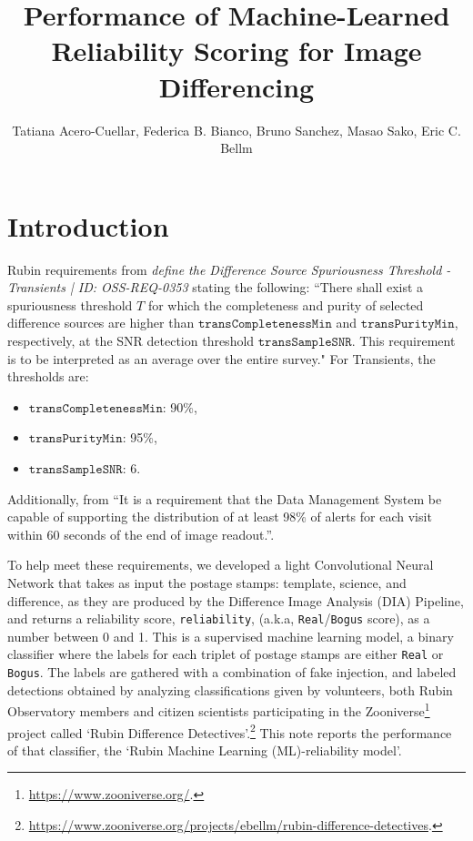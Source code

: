 \documentclass[DM,authoryear,toc]{lsstdoc}
\title{Performance of Machine-Learned Reliability Scoring for Image Differencing}
\date{\vcsDate}
\author{Tatiana Acero-Cuellar, Federica B. Bianco, Bruno Sanchez, Masao Sako, Eric C. Bellm}
\newcommand{\rel}{{\texttt{reliability}}}
\begin{document}
\maketitle


\section{Introduction}\label{sec:intro}
Rubin requirements from \textit{\cite
{LSE-30} define the Difference Source Spuriousness Threshold - Transients | ID: OSS-REQ-0353} stating the following:
``There shall exist a spuriousness threshold $T$ for which the completeness and purity of selected difference sources are higher than $\texttt{transCompletenessMin}$ and $\texttt{transPurityMin}$, respectively, at the SNR detection threshold $\texttt{transSampleSNR}$. This requirement is to be interpreted as an average over the entire survey."
For Transients, the thresholds are:
\begin{itemize}
    \item $\texttt{transCompletenessMin}$: 90\%,
    \item $\texttt{transPurityMin}$: 95\%, 
    \item $\texttt{transSampleSNR}$: 6.
\end{itemize}


Additionally, from \cite{DMTN-102} ``It is a requirement that the Data Management System be capable of supporting the distribution of at least 98\% of alerts for each visit within 60 seconds of the end of image readout.''.  



To help meet these requirements, we developed a light Convolutional Neural Network that takes as input the postage stamps: template, science, and difference, as they are produced by the Difference Image Analysis (DIA) Pipeline, and returns a reliability score, \rel, (a.k.a, \texttt{Real}/\texttt{Bogus} score), as a number between 0 and 1. This is a supervised machine learning model, a binary classifier where the labels for each triplet of postage stamps are either \texttt{Real} or \texttt{Bogus}. The labels are gathered with a combination of fake injection, and labeled detections obtained by analyzing classifications given by volunteers, both Rubin Observatory members and citizen scientists participating in the Zooniverse\footnote{\url{https://www.zooniverse.org/}.}  project called `Rubin Difference Detectives'.\footnote{\url{https://www.zooniverse.org/projects/ebellm/rubin-difference-detectives}.} This note reports the performance of that classifier, the `Rubin Machine Learning (ML)-reliability model'.
\end{document}
